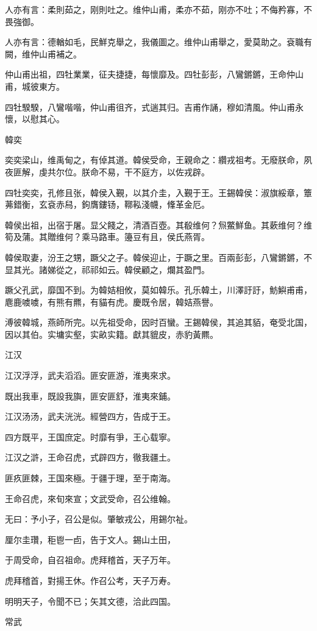 人亦有言：柔則茹之，刚則吐之。维仲山甫，柔亦不茹，刚亦不吐；不侮矜寡，不畏強御。

人亦有言：德輶如毛，民鮮克舉之，我儀圖之。维仲山甫舉之，愛莫助之。袞職有闕，维仲山甫補之。

仲山甫出祖，四牡業業，征夫捷捷，每懷靡及。四牡彭彭，八鸞鏘鏘，王命仲山甫，城彼東方。

四牡騤騤，八鸞喈喈，仲山甫徂齐，式遄其归。吉甫作誦，穆如清風。仲山甫永懷，以慰其心。

韓奕

奕奕梁山，维禹甸之，有倬其道。韓侯受命，王親命之：纘戎祖考。无廢朕命，夙夜匪解，虔共尔位。朕命不易，干不庭方，以佐戎辟。

四牡奕奕，孔修且张，韓侯入覲，以其介圭，入覲于王。王錫韓侯：淑旗綏章，簟茀錯衡，玄袞赤舄，鉤膺鏤钖，鞹鞃淺幭，鞗革金厄。

韓侯出祖，出宿于屠。显父餞之，清酒百壺。其殽维何？炰鱉鮮鱼。其蔌维何？维筍及蒲。其贈维何？乘马路車。籩豆有且，侯氏燕胥。

韓侯取妻，汾王之甥，蹶父之子。韓侯迎止，于蹶之里。百兩彭彭，八鸞鏘鏘，不显其光。諸娣從之，祁祁如云。韓侯顧之，爛其盈門。

蹶父孔武，靡国不到。为韓姞相攸，莫如韓乐。孔乐韓土，川澤訏訏，魴鱮甫甫，麀鹿噳噳，有熊有羆，有貓有虎。慶既令居，韓姞燕譽。

溥彼韓城，燕師所完。以先祖受命，因时百蠻。王錫韓侯，其追其貊，奄受北国，因以其伯。实墉实壑，实畝实籍。獻其貔皮，赤豹黃羆。

江汉

江汉浮浮，武夫滔滔。匪安匪游，淮夷來求。

既出我車，既設我旟，匪安匪舒，淮夷來鋪。

江汉汤汤，武夫洸洸。經營四方，告成于王。

四方既平，王国庶定。时靡有爭，王心载寧。

江汉之滸，王命召虎，式辟四方，徹我疆土。

匪疚匪棘，王国來極。于疆于理，至于南海。

王命召虎，來旬來宣；文武受命，召公维翰。

无曰：予小子，召公是似。肇敏戎公，用錫尔祉。

厘尔圭瓚，秬鬯一卣，告于文人。錫山土田，

于周受命，自召祖命。虎拜稽首，天子万年。

虎拜稽首，對揚王休。作召公考，天子万寿。

明明天子，令聞不已；矢其文德，洽此四国。

常武

